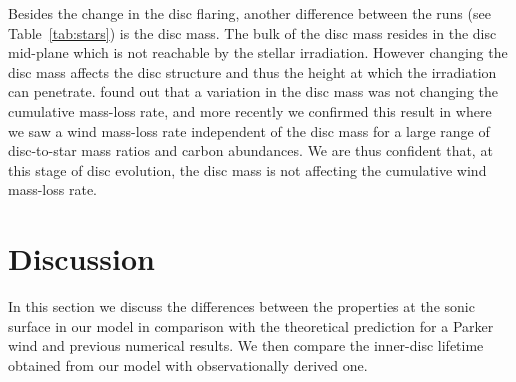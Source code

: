 \documentclass[usenatbib,useAMS,usedcolumn]{mnras}
\begin{document}
Besides the change in the disc flaring, another difference between the runs (see Table~\ref{tab:stars}) is the disc mass. The bulk of the disc mass resides in the disc mid-plane which is not reachable by the stellar irradiation. However changing the disc mass affects the disc structure and thus the height at which the irradiation can penetrate.  found out that a variation in the disc mass was not changing the cumulative mass-loss rate, and more recently we confirmed this result in  where we saw a wind mass-loss rate independent of the disc mass for a large range of disc-to-star mass ratios and carbon abundances. We are thus confident that, at this stage of disc evolution, the disc mass is not affecting the cumulative wind mass-loss rate.

\section{Discussion}\label{sec:discussion}

In this section we discuss the differences between the properties at the sonic surface in our model in comparison with the theoretical prediction for a Parker wind and previous numerical results. We then compare the inner-disc lifetime obtained from our model with observationally derived one.
\end{document}
